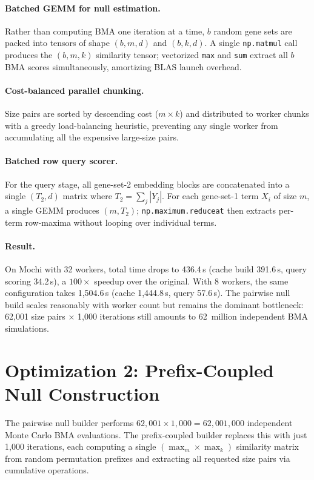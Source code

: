 \documentclass[11pt,a4paper]{article}
\begin{document}
\paragraph{Batched GEMM for null estimation.}
Rather than computing BMA one iteration at a time, $b$ random gene sets are
packed into tensors of shape $(b, m, d)$ and $(b, k, d)$. A single
\texttt{np.matmul} call produces the $(b, m, k)$ similarity tensor;
vectorized \texttt{max} and \texttt{sum} extract all $b$ BMA scores
simultaneously, amortizing BLAS launch overhead.

\paragraph{Cost-balanced parallel chunking.}
Size pairs are sorted by descending cost ($m \times k$) and distributed to
worker chunks with a greedy load-balancing heuristic, preventing any single
worker from accumulating all the expensive large-size pairs.

\paragraph{Batched row query scorer.}
For the query stage, all gene-set-2 embedding blocks are concatenated into a
single $(T_2, d)$ matrix where $T_2 = \sum_j |Y_j|$. For each gene-set-1
term $X_i$ of size $m$, a single GEMM produces $(m, T_2)$;
\texttt{np.maximum.reduceat} then extracts per-term row-maxima without
looping over individual terms.

\paragraph{Result.}
On Mochi with 32 workers, total time drops to 436.4\,s (cache build 391.6\,s,
query scoring 34.2\,s), a $100\times$ speedup over the original.
With 8 workers, the same configuration takes 1{,}504.6\,s (cache 1{,}444.8\,s,
query 57.6\,s). The pairwise null build scales reasonably with worker count
but remains the dominant bottleneck: 62{,}001 size pairs
$\times$ 1{,}000 iterations still amounts to 62~million independent BMA
simulations.

\section{Optimization 2: Prefix-Coupled Null Construction}

The pairwise null builder performs $62{,}001 \times 1{,}000 = 62{,}001{,}000$
independent Monte Carlo BMA evaluations. The prefix-coupled builder replaces
this with just 1{,}000 iterations, each computing a single
$(\max_m \times \max_k)$ similarity matrix from random permutation prefixes
and extracting all requested size pairs via cumulative operations.
\end{document}
